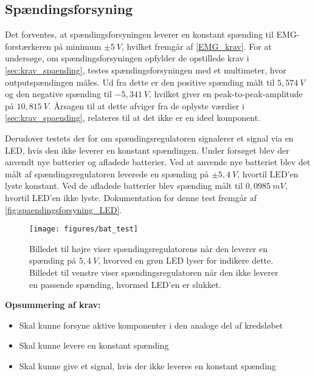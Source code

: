 \subsection{Spændingsforsyning} \label{test_spaendingsforsyning}
Det forventes, at spændingsforsyningen leverer en konstant spænding til EMG-forstærkeren på minimum $\pm 5~V$, hvilket fremgår af \autoref{EMG_krav}. For at undersøge, om spændingsforsyningen opfylder de opstillede krav i \ref{sec:krav_spaending}, testes spændingsforsyningen med et multimeter, hvor outputspændingen måles. %
Ud fra dette er den positive spænding målt til $5,574~V$ og den negative spænding til $-5,341~V$, hvilket giver en peak-to-peak-amplitude på $10,815~V$. Årsagen til at dette afviger fra de oplyste værdier i \autoref{sec:krav_spaending}, relateres til at det ikke er en ideel komponent. 

%
Derudover testets der for om spændingsregulatoren signalerer et signal via en LED, hvis den ikke leverer en konstant spændingen. Under forsøget blev der anvendt nye batterier og afladede batterier. Ved at anvende nye batteriet blev det målt af spændingsregulatoren leverede en spænding på $\pm5,4~V$, hvortil LED'en lyste konstant. Ved de afladede batterier blev spænding målt til  $0,0985~mV$, hvortil LED'en ikke lyste. Dokumentation for denne test fremgår af \autoref{fig:spaendingsforsyning_LED}.


\begin{figure}[H]
\centering
\texttt{[image: figures/bat\_test]}
\caption{Billedet til højre viser spændingsregulatorens når den leverer en spænding på $5,4~V$, hvorved en grøn LED lyser for indikere dette. Billedet til venstre viser spændingsregulatoren når den ikke leverer en passende spænding, hvormed LED'en er slukket.}
\label{fig:spaendingsforsyning_LED}
\end{figure}

\vspace{3mm}
\textbf{Opsummering af krav:}
\begin{itemize} 
\item[\text{\sffamily \checkmark}] Skal kunne forsyne aktive komponenter i den analoge del af kredsløbet
\item[\text{\sffamily \checkmark}] Skal kunne levere en konstant spænding
\item[\text{\sffamily \checkmark}] Skal kunne give et signal, hvis der ikke leveres en konstant spænding
\end{itemize}

